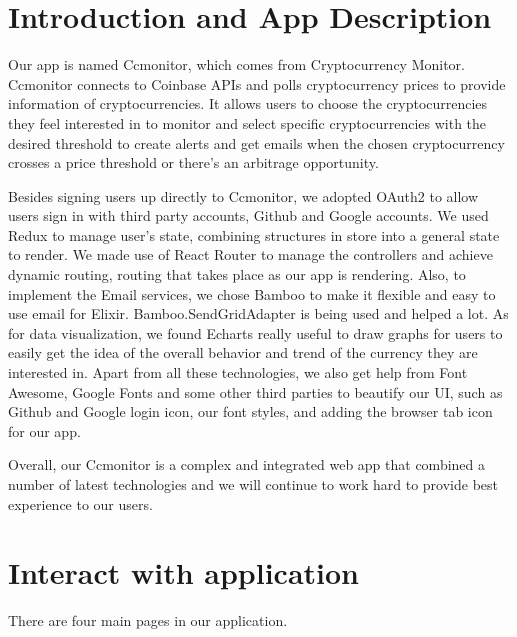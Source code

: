 \section{Introduction and App Description}
Our app is named Ccmonitor, which comes from Cryptocurrency Monitor. 
Ccmonitor connects to Coinbase APIs and polls cryptocurrency prices
to provide information of cryptocurrencies. It allows users to choose 
the cryptocurrencies they feel interested in to monitor and select 
specific cryptocurrencies with the desired threshold to create alerts 
and get emails when the chosen cryptocurrency crosses a price 
threshold or there’s an arbitrage opportunity. 

Besides signing users up directly to Ccmonitor, we adopted OAuth2 
to allow users sign in with third party accounts, Github and Google 
accounts. We used Redux to manage user’s state, combining structures 
in store into a general state to render. We made use of React Router 
to manage the controllers and achieve dynamic routing, routing that 
takes place as our app is rendering. Also, to implement the Email 
services, we chose Bamboo to make it flexible and easy to use email 
for Elixir. Bamboo.SendGridAdapter is being used and helped a lot. 
As for data visualization, we found Echarts really useful to draw 
graphs for users to easily get the idea of the overall behavior and 
trend of the currency they are interested 
in. Apart from all these technologies, we also get help from Font 
Awesome, Google Fonts and some other third parties to beautify our 
UI, such as Github and Google login icon, our font styles, and 
adding the browser tab icon for our app.

Overall, our Ccmonitor is a complex and integrated web app that 
combined a number of latest technologies and we will continue to 
work hard to provide best experience to our users.


\section{Interact with application}
There are four main pages in our application.

